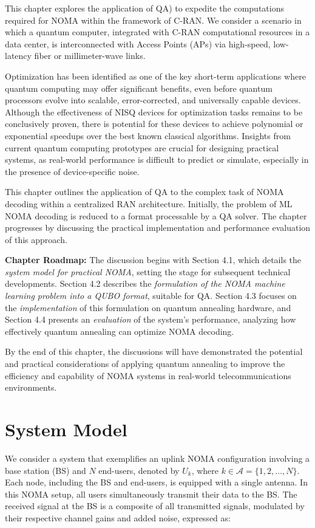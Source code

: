 This chapter explores the application of QA) to expedite the computations required for NOMA within the framework of C-RAN. We consider a scenario in which a quantum computer, integrated with C-RAN computational resources in a data center, is interconnected with Access Points (APs) via high-speed, low-latency fiber or millimeter-wave links.

Optimization has been identified as one of the key short-term applications where quantum computing may offer significant benefits, even before quantum processors evolve into scalable, error-corrected, and universally capable devices. Although the effectiveness of NISQ devices for optimization tasks remains to be conclusively proven, there is potential for these devices to achieve polynomial or exponential speedups over the best known classical algorithms. Insights from current quantum computing prototypes are crucial for designing practical systems, as real-world performance is difficult to predict or simulate, especially in the presence of device-specific noise.

This chapter outlines the application of QA to the complex task of NOMA decoding within a centralized RAN architecture. Initially, the problem of ML NOMA decoding is reduced to a format processable by a QA solver. The chapter progresses by discussing the practical implementation and performance evaluation of this approach.

\textbf{Chapter Roadmap:} The discussion begins with Section 4.1, which details the \textit{system model for practical NOMA}, setting the stage for subsequent technical developments. Section 4.2 describes the \textit{formulation of the NOMA machine learning problem into a QUBO format}, suitable for QA. Section 4.3 focuses on the \textit{implementation} of this formulation on quantum annealing hardware, and Section 4.4 presents an \textit{evaluation} of the system's performance, analyzing how effectively quantum annealing can optimize NOMA decoding.

By the end of this chapter, the discussions will have demonstrated the potential and practical considerations of applying quantum annealing to improve the efficiency and capability of NOMA systems in real-world telecommunications environments.
\section{System Model}
\label{section:system_model}

We consider a system that exemplifies an uplink NOMA configuration involving a base station (BS) and $N$ end-users, denoted by $U_k$, where \(k \in \mathcal{A} = \{1, 2, \ldots, N\}\). Each node, including the BS and end-users, is equipped with a single antenna. In this NOMA setup, all users simultaneously transmit their data to the BS. The received signal at the BS is a composite of all transmitted signals, modulated by their respective channel gains and added noise, expressed as:

